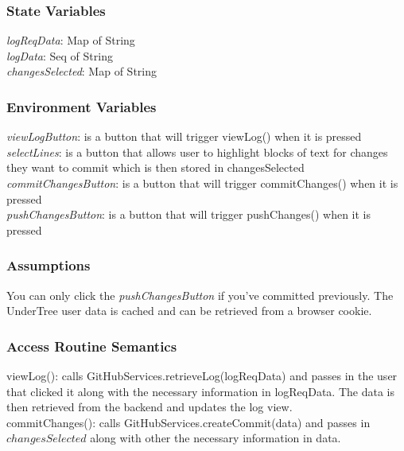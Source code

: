 \documentclass[12pt, titlepage]{article}
\begin{document}
	\subsubsection{State Variables}
	\textit{logReqData}: Map of String \\
	\textit{logData}: Seq of String \\
	\textit{changesSelected}: Map of String \\
	
	
	\subsubsection{Environment Variables}
	
	\noindent \textit{viewLogButton}: is a button that will trigger viewLog() when it is pressed \\
	
	\noindent \textit{selectLines}: is a button that allows user to highlight blocks of text for changes they want to commit which is then stored in changesSelected \\
	
	\noindent \textit{commitChangesButton}: is a button that will trigger commitChanges() when it is pressed \\
	
	\textit{pushChangesButton}: is a button that will trigger pushChanges() when it is pressed \\
	
	
	\subsubsection{Assumptions}
	
	You can only click the \textit{pushChangesButton} if you've committed previously. The UnderTree user data is cached and can be retrieved from a browser cookie.
	
	\subsubsection{Access Routine Semantics}
	
	\noindent viewLog(): calls GitHubServices.retrieveLog(logReqData) and passes in the user that clicked it along with the necessary information in logReqData. The data is then retrieved from the backend and updates the log view. \\
	
	\noindent commitChanges(): calls GitHubServices.createCommit(data) and passes in $changesSelected$ along with other the necessary information in data. \\
	
\end{document}
